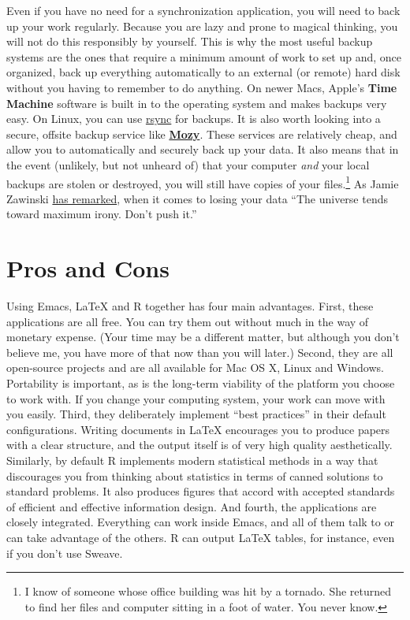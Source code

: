 \documentclass[11pt,article,oneside]{memoir}
\begin{document}
Even if you have no need for a synchronization application, you will need to back up your work regularly. Because you are lazy and prone to magical thinking, you will not do this responsibly by yourself. This is why the most useful backup systems are the ones that require a minimum amount of work to set up and, once organized, back up everything automatically to an external (or remote) hard disk without you having to remember to do anything. On newer Macs, Apple's \textbf{Time Machine} software is built in to the operating system and makes backups very easy. On Linux, you can use \href{http://www.psychocats.net/ubuntu/backup}{rsync} for backups. It is also  worth looking into a secure, offsite backup service like \href{http://mozy.com/}{\textbf{Mozy}}. These services are relatively cheap, and allow you to automatically and securely back up your data. It also means that in the event (unlikely, but not unheard of) that your computer \emph{and} your local backups are stolen or destroyed, you will still have copies of your files.\footnote{I know of someone whose office building was hit by a tornado. She returned to find her files and computer sitting in a foot of water. You never know.} As Jamie Zawinski \href{http://jwz.livejournal.com/801607.html}{has remarked}, when it comes to losing your data ``The universe tends toward maximum irony. Don't push it.''

\section{Pros and Cons}  
Using Emacs, LaTeX and R together has four main advantages. First, these applications are all free. You can try them out without much in the way of monetary expense. (Your time may be a different matter, but although you don't believe me, you have more of that now than you will later.) Second, they are all open-source projects and are all available for Mac OS X, Linux and Windows. Portability is important, as is the long-term viability of the platform you choose to work with. If you change your computing system, your work can move with you easily. Third, they deliberately implement ``best practices'' in their default configurations. Writing documents in LaTeX encourages you to produce papers with a clear structure, and the output itself is of very high quality aesthetically. Similarly, by default R implements modern statistical methods in a way that discourages you from thinking about statistics in terms of canned solutions to standard problems. It also produces figures that accord with accepted standards of efficient and effective information design. And fourth, the applications are closely integrated. Everything can work inside Emacs, and all of them talk to or can take advantage of the others. R can output LaTeX tables, for instance, even if you don't use Sweave.
\end{document}
